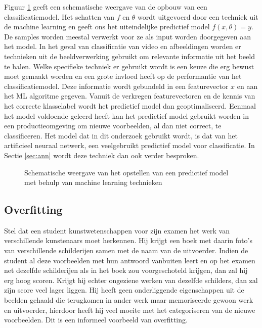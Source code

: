 \npar Figuur \ref{fig:alg-class-model} geeft een schematische weergave van de opbouw van een classificatiemodel. Het schatten van $f$ en $\theta$ wordt uitgevoerd door een techniek uit de machine learning en geeft ons het uiteindelijke predictief model $f(x,\theta) = y$. De samples worden meestal verwerkt voor ze als input worden doorgegeven aan het model. In het geval van classificatie van video en afbeeldingen worden er technieken uit de beeldverwerking gebruikt om relevante informatie uit het beeld te halen. Welke specifieke techniek er gebruikt wordt is een keuze die erg bewust moet gemaakt worden en een grote invloed heeft op de performantie van het classificatiemodel. Deze informatie wordt gebundeld in een featurevector $x$ en aan het ML algoritme gegeven. Vanuit de verkregen featurevectoren en de kennis van het correcte klasselabel wordt het predictief model dan geoptimaliseerd.
\npar Eenmaal het model voldoende geleerd heeft kan het predictief model gebruikt worden in een productieomgeving om nieuwe voorbeelden, al dan niet correct, te classificeren.
\npar Het model dat in dit onderzoek gebruikt wordt, is dat van het artificieel neuraal netwerk, een veelgebruikt predictief model voor classificatie. In Sectie \ref{sec:ann} wordt deze techniek dan ook verder besproken.
\begin{figure}[t]
	\centering
	\def\svgscale{0.85}
	
	\caption{Schematische weergave van het opstellen van een predictief model met behulp van machine learning technieken \label{fig:alg-class-model}}
\end{figure}

\subsection{Overfitting}
Stel dat een student kunstwetenschappen voor zijn examen het werk van verschillende kunstenaars moet herkennen. Hij krijgt een boek met daarin foto's van verschillende schilderijen samen met de naam van de uitvoerder. Indien de student al deze voorbeelden met hun antwoord vanbuiten leert en op het examen net dezelfde schilderijen als in het boek zou voorgeschoteld krijgen, dan zal hij erg hoog scoren. Krijgt hij echter ongeziene werken van dezelfde schilders, dan zal zijn score veel lager liggen. Hij heeft geen onderliggende eigenschappen uit de beelden gehaald die terugkomen in ander werk maar memoriseerde gewoon werk en uitvoerder, hierdoor heeft hij veel moeite met het categoriseren van de nieuwe voorbeelden. Dit is een informeel voorbeeld van overfitting.

